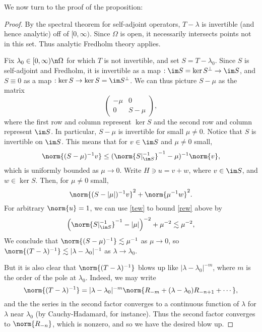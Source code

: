 \documentclass[12pt]{article}
\begin{document}
We now turn to the proof of the proposition:
\begin{proof}By the spectral theorem for self-adjoint operators, $T-\lambda$ is invertible (and hence analytic) off of $[0,\infty)$. Since $\Omega$ is open, it necessarily intersects points not in this set. Thus analytic Fredholm theory applies.

Fix $\lambda_0 \in [0,\infty)\n \Omega$ for which $T$ is not invertible, and set $S = T-\lambda_0$.
Since $S$ is self-adjoint and Fredholm, it is invertible as a map $:\im S = \ker S^\bot \to \im S$, and $S\equiv 0$ as a map $:\ker S \to \ker S = \im S^{\bot}$. We can thus picture $S-\mu$ as the matrix
\[\begin{pmatrix}-\mu & 0\\
0&S-\mu \end{pmatrix},\]
where the first row and column represent $\ker S$ and the second row and column represent $\im S$. In particular, $S-\mu$ is invertible for small $\mu \neq 0$.
Notice that $S$ is invertible on $\im S$. This means that for $v \in \im S$ and $\mu \neq 0$ small,
\begin{equation}\label{tew}\norm{(S-\mu)^{-1}v} \leq (\norm{S|_{\im S}^{-1}}^{-1}-\mu)^{-1}\norm{v},\end{equation} which is uniformly bounded as $\mu \to 0$.
Write $H \ni u = v+w$, where $v \in \im S$, and $w \in \ker S$. Then, for $\mu \neq 0$ small,
\begin{equation}\label{rew}\norm{(S-|\mu|)^{-1}v}^2+ \norm{\mu^{-1}w}^2.\end{equation}
For arbitrary $\norm{u} = 1$, we can use \eqref{tew} to bound \eqref{rew} above by
\begin{equation}\label{one} \left(\norm{S|_{\im S}^{-1}}^{-1}-|\mu|\right)^{-2} + \mu^{-2} \lesssim \mu^{-2},\end{equation}
We conclude that $\norm{(S-\mu)^{-1}} \lesssim \mu^{-1}$ as $\mu \to 0$, so $\norm{(T-\lambda)^{-1}} \lesssim |\lambda-\lambda_0|^{-1}$ as $\lambda \to \lambda_0$.

But it is also clear that $\norm{(T-\lambda)^{-1}}$ blows up like $|\lambda-\lambda_0|^{-m}$, where $m$ is the order of the pole at $\lambda_0$. Indeed, we may write
\[\norm{(T-\lambda)^{-1}} = |\lambda-\lambda_0|^{-m}\norm{R_{-m}+(\lambda-\lambda_0)R_{-n+1}+\cdots},\]
and the the series in the second factor converges to a continuous function of $\lambda$ for $\lambda$ near $\lambda_0$ (by Cauchy-Hadamard, for instance). Thus the second factor converges to $\norm{R_{-n}}$, which is nonzero, and so we have the desired blow up.


\end{proof}
\end{document}
